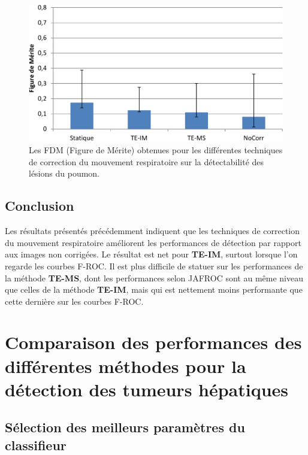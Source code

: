 \begin{figure}[h!]
 \begin{center}
   \includegraphics[width=13cm]{images/FOM_mod}
 \end{center}
 \caption{Les FDM (Figure de Mérite) obtenues pour les différentes techniques de correction du mouvement respiratoire sur la détectabilité des lésions du poumon.}
 \label{fig:fom_mod}
\end{figure}

\subsection{Conclusion}

Les résultats présentés précédemment indiquent que les techniques de correction du mouvement respiratoire améliorent les performances de détection par rapport aux images non corrigées. Le résultat est net pour \textbf{TE-IM}, surtout lorsque l'on regarde les courbes F-ROC. Il est plus difficile de statuer sur les performances de la méthode \textbf{TE-MS}, dont les performances selon JAFROC sont au même niveau que celles de la méthode \textbf{TE-IM}, mais qui est nettement moins performante que cette dernière sur les courbes F-ROC.


\FloatBarrier

\section{Comparaison des performances des différentes méthodes pour la détection des tumeurs hépatiques}


\subsection{Sélection des meilleurs paramètres du classifieur}

